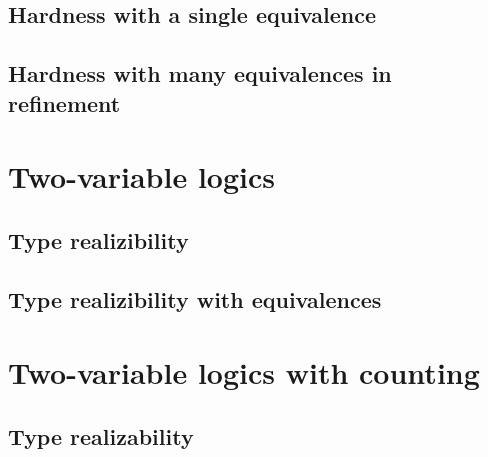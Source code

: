 \documentclass{scrbook}
\begin{document}
\section{Hardness with a single equivalence}\label{sec:hardness-one}


\section{Hardness with many equivalences in refinement}



\chapter{Two-variable logics}\label{ch:twovar}


\section{Type realizibility}


\section{Type realizibility with equivalences}



\chapter{Two-variable logics with counting}


\section{Type realizability}




\end{document}
